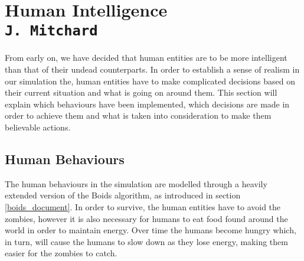 \pagestyle{empty}



\section{Human Intelligence\\{\small\tt J.~Mitchard}}
From early on, we have decided that human entities are to be more intelligent than that of their undead counterparts. In order to establish a sense of realism in our simulation the, human entities have to make complicated decisions based on their current situation and what is going on around them. This section will explain which behaviours have been implemented, which decisions are made in order to achieve them and what is taken into consideration to make them believable actions.

\subsection{Human Behaviours}
The human behaviours in the simulation are modelled through a heavily extended version of the Boids algorithm, as introduced in section \ref{boids_document}. In order to survive, the human entities have to avoid the zombies, however it is also necessary for humans to eat food found around the world in order to maintain energy. Over time the humans become hungry which, in turn, will cause the humans to slow down as they lose energy, making them easier for the zombies to catch.

